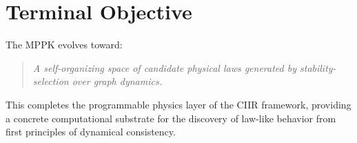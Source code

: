 \section{Terminal Objective}
\label{sec:mppk-terminal}

The MPPK evolves toward:

\begin{quote}
\emph{A self-organizing space of candidate physical laws generated by
stability-selection over graph dynamics.}
\end{quote}

\noindent
This completes the programmable physics layer of the CIIR framework,
providing a concrete computational substrate for the discovery of
law-like behavior from first principles of dynamical consistency.
